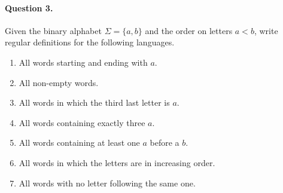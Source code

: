 \paragraph{Question 3.} Given the binary alphabet \(\Sigma = \{a,
b\}\) and the order on letters \(a < b\), write regular definitions
for the following languages.
\begin{enumerate}

  \item All words starting and ending with \(a\).

  \item All non-empty words.

  \item All words in which the third last letter is \(a\).

  \item All words containing exactly three \(a\).

  \item All words containing at least one \(a\) before a \(b\).

  \item All words in which the letters are in increasing order.

  \item All words with no letter following the same one.

\end{enumerate}
